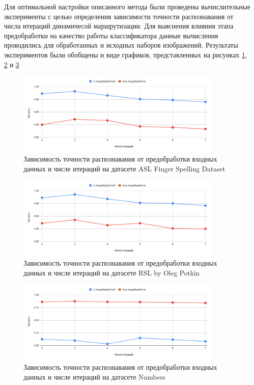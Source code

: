 Для оптимальной настройки описанного метода были проведены вычислительные эксперименты с целью определения зависимости точности распознавания от числа итераций динамичесой маршрутизации. Для выяснения влияния этапа предобработки на качество работы классификатора данные вычисления проводились для обработанных и исходных наборов изображений. Результаты экспериментов были обобщены и виде графиков, представленных на рисунках \ref{res:asl}, \ref{res:rsl_oleg} и \ref{res:number}

\begin{figure}[!h]
	\centering
	\includegraphics[width=0.9\textwidth]{inc/img/asl}
	\caption{Зависимость точности распознавания от предобработки входных данных и числе итераций на датасете ASL Finger Spelling Dataset}
	\label{res:asl}
\end{figure}

\begin{figure}[!h]
	\centering
	\includegraphics[width=0.9\textwidth]{inc/img/rsl_oleg}
	\caption{Зависимость точности распознавания от предобработки входных данных и числе итераций на датасете RSL by Oleg Potkin}
	\label{res:rsl_oleg}
\end{figure}

\begin{figure}[!h]
	\centering
	\includegraphics[width=0.9\textwidth]{inc/img/rsl_hse}
	\caption{Зависимость точности распознавания от предобработки входных данных и числе итераций на датасете Numbers}
	\label{res:number}
\end{figure}

